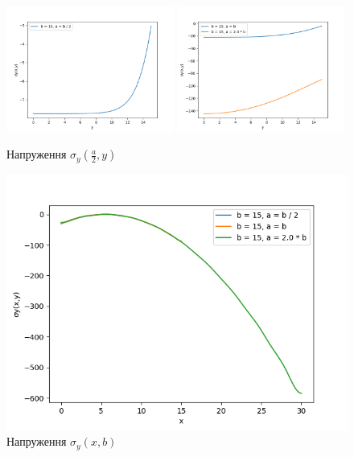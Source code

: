 \begin{figure}[h!]
    \begin{center}
        \includegraphics[width=0.49\textwidth, scale=1]{images/results/static_1/sigma_y(a:2,y)1.png}
        \includegraphics[width=0.49\textwidth, scale=1]{images/results/static_1/sigma_y(a:2,y)2.png}
        \caption{Напруження $\sigma_y(\frac{a}{2}, y)$}\label{static_1_sigma_y(a:2,y)}
    \end{center}
\end{figure}


\begin{figure}[h!]
    \begin{center}
        \includegraphics[width=1\textwidth, scale=1]{images/results/static_1/sigma_y(x,b).png}
        \caption{Напруження $\sigma_y(x, b)$}\label{static_1_sigma_y(x,b)}
    \end{center}
\end{figure}

